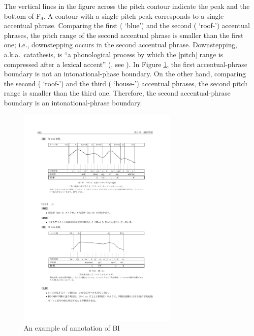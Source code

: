 The vertical lines in the figure across the pitch contour indicate
the peak and the bottom of F$_{0}$.
A contour with a single pitch peak corresponds to a single accentual phrase.
Comparing the first ( `blue') and the second ( `roof-') accentual phrases,
the pitch range of the second accentual phrase is smaller than the first one;
i.e., downstepping occurs in the second accentual phrase.
Downstepping, a.k.a.~catathesis, is ``a phonological process by which the [pitch] range is compressed after a lexical accent'' (, see ).
In Figure \ref{BIexF}, the first accentual-phrase boundary is not an intonational-phase boundary.
On the other hand,
comparing the second ( `roof-') and the third ( `house-') accentual phrases,
the second pitch range is smaller than the third one.
Therefore,
the second accentual-phrase boundary is an intonational-phrase boundary.

\begin{figure}
 \centering
 \includegraphics[width=0.7\textwidth]{figure_BIex.pdf}
 \caption{An example of annotation of BI \cite[][p.~412]{igarashietal06}}
 \label{BIexF}
\end{figure}


